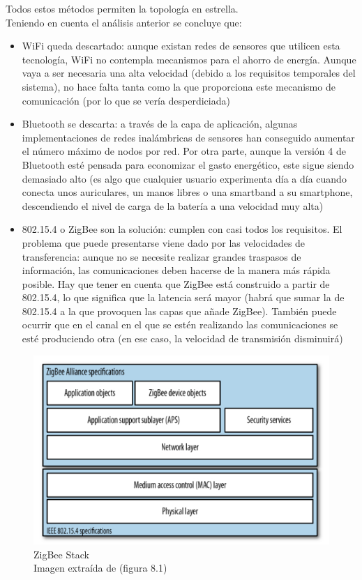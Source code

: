 Todos estos métodos permiten la topología en estrella.\\

Teniendo en cuenta el análisis anterior se concluye que:
\begin{itemize}
  \item WiFi queda descartado: aunque existan redes de sensores que utilicen esta tecnología,
  WiFi no contempla mecanismos para el ahorro de energía. Aunque vaya a ser necesaria una alta velocidad
  (debido a los requisitos temporales del sistema), no hace falta tanta como la que
  proporciona este mecanismo de comunicación (por lo que se vería desperdiciada)
  \item Bluetooth se descarta: a través de la capa de aplicación, algunas implementaciones
  de redes inalámbricas de sensores han conseguido aumentar el número máximo de nodos por red.
  Por otra parte, aunque la versión 4 de Bluetooth esté pensada para economizar el gasto energético,
  este sigue siendo demasiado alto (es algo que cualquier usuario experimenta día a día cuando
  conecta unos auriculares, un manos libres o una smartband a su smartphone, descendiendo el nivel de
  carga de la batería a una velocidad muy alta)
  \item 802.15.4 o ZigBee son la solución: cumplen con casi todos los requisitos.
  El problema que puede presentarse viene dado por las velocidades de transferencia: aunque no
  se necesite realizar grandes traspasos de información, las comunicaciones deben
  hacerse de la manera más rápida posible. Hay que tener en cuenta que ZigBee está construido a partir
  de 802.15.4, lo que significa que la latencia será mayor (habrá que sumar la de 802.15.4 a la que provoquen
  las capas que añade ZigBee). También puede ocurrir que en el canal en el que se estén realizando las comunicaciones
  se esté produciendo otra (en ese caso, la velocidad de transmisión disminuirá)
\end{itemize}

\begin{figure}[htb]
\centering
\captionsetup{justification=centering}
\includegraphics[width=1\textwidth]{./imagenes/zigbeestack}
\caption{ZigBee Stack \\
\scriptsize{Imagen extraída de \cite{faludi} (figura 8.1)} } \label{fig:stackzigbee}
\end{figure}

